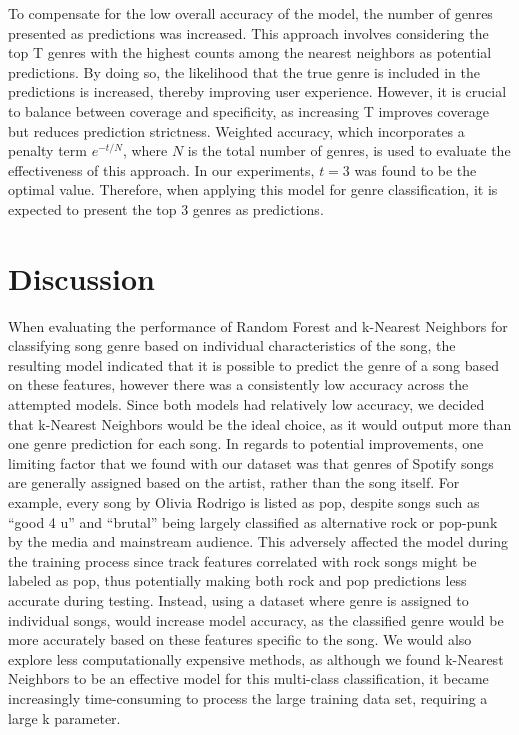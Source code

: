 \documentclass[times, twocolumn]{article}
\begin{document}
To compensate for the low overall accuracy of the model, the number of genres presented as predictions was increased. This approach involves considering the top T genres with the highest counts among the nearest neighbors as potential predictions. By doing so, the likelihood that the true genre is included in the predictions is increased, thereby improving user experience. However, it is crucial to balance between coverage and specificity, as increasing T improves coverage but reduces prediction strictness. Weighted accuracy, which incorporates a penalty term $e^{-t/N}$, where $N$ is the total number of genres, is used to evaluate the effectiveness of this approach. In our experiments, $t=3$ was found to be the optimal value. Therefore, when applying this model for genre classification, it is expected to present the top 3 genres as predictions.

\section{Discussion}
When evaluating the performance of Random Forest and k-Nearest Neighbors for classifying song genre based on individual characteristics of the song, the resulting model indicated that it is possible to predict the genre of a song based on these features, however there was a consistently low accuracy across the attempted models. Since both models had relatively low accuracy, we decided that k-Nearest Neighbors would be the ideal choice, as it would output more than one genre prediction for each song. In regards to potential improvements, one limiting factor that we found with our dataset was that genres of Spotify songs are generally assigned based on the artist, rather than the song itself. For example, every song by Olivia Rodrigo is listed as pop, despite songs such as “good 4 u” and “brutal” being largely classified as alternative rock or pop-punk by the media and mainstream audience. This adversely affected the model during the training process since track features correlated with rock songs might be labeled as pop, thus potentially making both rock and pop predictions less accurate during testing. Instead, using a dataset where genre is assigned to individual songs, would increase model accuracy, as the classified genre would be more accurately based on these features specific to the song. We would also explore less computationally expensive methods, as although we found k-Nearest Neighbors to be an effective model for this multi-class classification, it became increasingly time-consuming to process the large training data set, requiring a large k parameter. 
\end{document}
